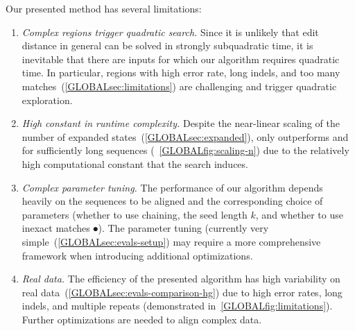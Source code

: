 Our presented method has several limitations:
\begin{enumerate}
  \item \emph{Complex regions trigger quadratic search.} Since it is unlikely
        that edit distance in general can be solved in strongly subquadratic
        time, it is inevitable that there are inputs for which our algorithm
        requires quadratic time.  In particular, regions with high error rate,
        long indels, and too many matches~(\cref{GLOBALsec:limitations}) are
        challenging and trigger quadratic exploration.
  \item \emph{High constant in runtime complexity.} Despite the near-linear
        scaling of the number of expanded states~(\cref{GLOBALsec:expanded}),
        \astarpa only outperforms \edlib and \wfa for sufficiently long sequences
        (~\cref{GLOBALfig:scaling-n}) due to the relatively high computational constant
        that the \A search induces.
  \item \emph{Complex parameter tuning.} The performance of our algorithm
        depends heavily on the sequences to be aligned and the corresponding choice of
        parameters (whether to use chaining, the seed length $k$, and whether to use
        inexact matches $\spot$). The parameter tuning (currently
        very simple~(\cref{GLOBALsec:evals-setup}) may require a more comprehensive
        framework when introducing additional optimizations.
  \item \emph{Real data.} The efficiency of the presented algorithm has high
        variability on real data~(\cref{GLOBALsec:evals-comparison-hg}) due to high
        error rates, long indels, and multiple repeats (demonstrated
        in~\cref{GLOBALfig:limitations}). Further optimizations are needed to align
        complex data.
\end{enumerate}
